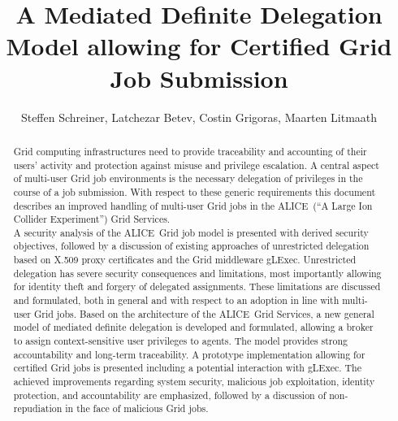 \documentclass[10pt]{iopart}
\newcommand{\alice}{ALICE}
\newcommand{\alicee}{A Large Ion Collider Experiment}
\begin{document}
\title{A Mediated Definite Delegation Model allowing for Certified Grid Job Submission}


	\author{Steffen Schreiner, Latchezar Betev, Costin
Grigoras, Maarten Litmaath}
	\address{ European Organization for Nuclear Research CERN, Geneva,
	Switzerland}
	\address{ Center for Advanced Security Research Darmstadt - CASED\\~~~and
	Technische Universit\"{a}t Darmstadt, Germany}








\begin{abstract}
Grid computing infrastructures need to provide
traceability and accounting of their users' activity and
protection against misuse and privilege escalation.
A central aspect of multi-user Grid job environments is
the necessary delegation of privileges in the course of a job submission. 
With respect to these generic requirements
this document describes an improved handling of multi-user
Grid jobs in the \alice\ (``\alicee'') Grid Services.\\
A security analysis of the \alice\ Grid
job model is presented with derived security objectives, followed by a
discussion of existing approaches of unrestricted delegation based on X.509
proxy certificates and the Grid middleware gLExec. Unrestricted
delegation has severe security consequences and limitations,
most importantly allowing for identity theft and forgery of delegated assignments.
These limitations are discussed and formulated, both in general and with respect
to an adoption in line with multi-user Grid jobs. Based on the architecture of
the \alice\ Grid Services, a new general model of mediated definite delegation is
developed and formulated, allowing a broker to assign context-sensitive user
privileges to agents. The model provides strong accountability and long-term 
traceability. A prototype implementation allowing for certified Grid jobs is
presented including a potential interaction with gLExec. The achieved 
improvements regarding system security, malicious job exploitation, identity
protection, and accountability are emphasized, followed by a
discussion of non-repudiation in the face of malicious Grid jobs.
\end{abstract}
\end{document}
